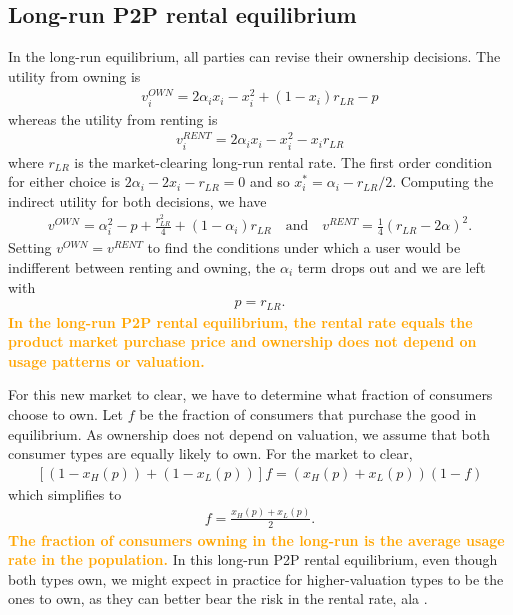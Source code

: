 \documentclass[11pt]{article}
\newcommand{\important}[1]{\textcolor{orange}{\textbf{#1}}}
\newcommand{\important}[1]{#1}
\begin{document}
\subsection{Long-run P2P rental equilibrium} 
In the long-run equilibrium, all parties can revise their ownership decisions. 
The utility from owning is 
\begin{align}
v^{OWN}_i = 2\alpha_i x_i - x_i^2 + (1-x_i)r_{LR} - p   
\end{align} 
whereas the utility from renting is 
\begin{align}
v^{RENT}_{i} = 2\alpha_i x_i - x_i^2 - x_i r_{LR}  
\end{align} 
where $r_{LR}$ is the market-clearing long-run rental rate. 
The first order condition for either choice is $2 \alpha_i - 2 x_i - r_{LR} = 0$ and so $x^*_i = \alpha_i - r_{LR}/2$. 
Computing the indirect utility for both decisions, we have
\begin{align} 
v^{OWN} = \alpha_i^2 - p + \frac{r_{LR}^2}{4} + (1 - \alpha_i) r_{LR} \quad  \mbox{and} \quad v^{RENT} = \frac{1}{4} (r_{LR}- 2\alpha )^2. 
\end{align} 
Setting $v^{OWN} = v^{RENT}$ to find the conditions under which a user would be indifferent between renting and owning, the $\alpha_i$ term drops out and we are left with 
\begin{align}
p = r_{LR}. 
\end{align}
 \important{In the long-run P2P rental equilibrium, the rental rate equals the product market purchase price and ownership does not depend on usage patterns or valuation.}  

For this new market to clear, we have to determine what fraction of consumers choose to own. 
Let $f$ be the fraction of consumers that purchase the good in equilibrium. 
As ownership does not depend on valuation, we assume that both consumer types are equally likely to own. 
For the market to clear, 
\begin{align}
\left[ (1-x_H(p)) + (1-x_L(p))\right]f = \left(x_H(p) + x_L(p) \right)(1- f) 
\end{align} 
which simplifies to 
\begin{align}
f = \frac{x_H(p) + x_L(p)}{2}.  
\end{align} 
\important{The fraction of consumers owning in the long-run is the average usage rate in the population.}  
In this long-run P2P rental equilibrium, even though both types own, we might expect in practice for higher-valuation types to be the ones to own, as they can better bear the risk in the rental rate, ala \cite{sinai2005}.
\end{document}
